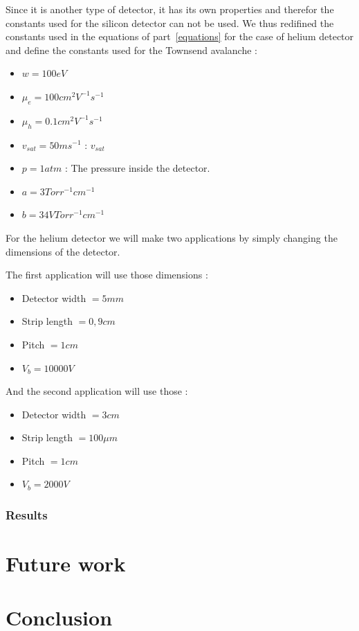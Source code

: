 \documentclass[11pt]{article}
\begin{document}
			Since it is another type of detector, it has its own properties and therefor the constants
			used for the silicon detector can not be used. We thus redifined the constants used in the
			equations of part~\ref{equations} for the case of helium detector and define the constants
			used for the Townsend avalanche :

			\begin{itemize}

				\item $w = 100 eV$
				\item $\mu_e = 100 cm^2V^{-1}s^{-1}$ 
				\item $\mu_h = 0.1 cm^2V^{-1}s^{-1}$
				\item $v_{sat} = 50 ms^{-1}$ : $v_{sat}$
				\item $p = 1 atm$ : The pressure inside the detector.
				\item $a = 3 Torr^{-1}cm^{-1}$
				\item $b = 34 VTorr^{-1}cm^{-1}$

			\end{itemize}

			For the helium detector we will make two applications by simply changing the dimensions of
			the detector.

			The first application will use those dimensions :
			\begin{itemize}

				\item Detector width $= 5 mm$
				\item Strip length $= 0,9 cm$
				\item Pitch $= 1 cm$
				\item $V_b = 10000 V$

			\end{itemize}

			And the second application will use those :

			\begin{itemize}

				\item Detector width $= 3 cm$
				\item Strip length $= 100 \mu m$
				\item Pitch $= 1 cm$
				\item $V_b = 2000 V$

			\end{itemize}

		\subsubsection*{Results}


\section{Future work}

\section{Conclusion}

\newpage



\end{document}
